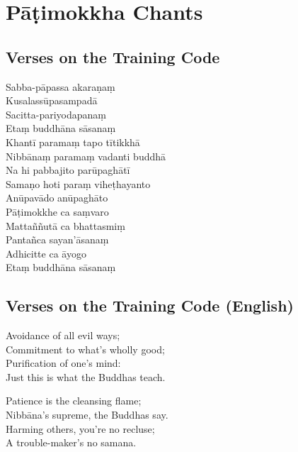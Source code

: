 \chapter{Pāṭimokkha Chants}

\section{Verses on the Training Code}

\begin{leader}
\end{leader}


Sabba-pāpassa akaraṇaṃ\\
Kusalassūpasampadā\\
Sacitta-pariyodapanaṃ\\
Etaṃ buddhāna sāsanaṃ\\
Khantī paramaṃ tapo tītikkhā\\
Nibbānaṃ paramaṃ vadanti buddhā\\
Na hi pabbajito parūpaghātī\\
Samaṇo hoti paraṃ viheṭhayanto\\
Anūpavādo anūpaghāto\\
Pāṭimokkhe ca saṃvaro\\
Mattaññutā ca bhattasmiṃ\\
Pantañca sayan'āsanaṃ\\
Adhicitte ca āyogo\\
Etaṃ buddhāna sāsanaṃ


\section{Verses on the Training Code (English)}

Avoidance of all evil ways;\\
Commitment to what's wholly good;\\
Purification of one's mind:\\
Just this is what the Buddhas teach.

Patience is the cleansing flame;\\
Nibbāna's supreme, the Buddhas say.\\
Harming others, you're no recluse;\\
A trouble-maker's no samana.

